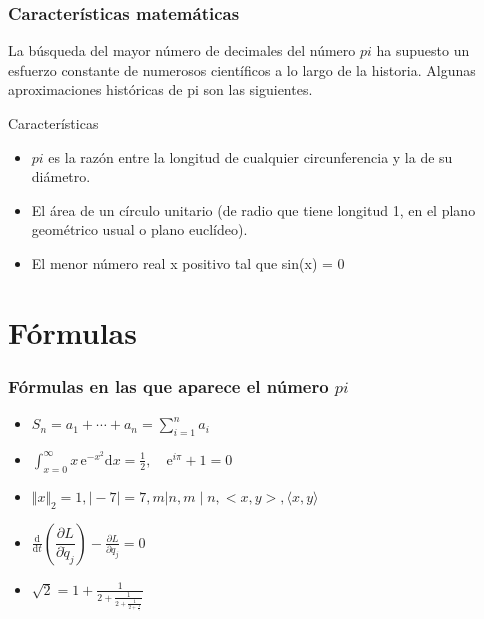 \documentclass{beamer}
\begin{document}
\begin{frame}

\frametitle{Características matemáticas}
La búsqueda del mayor número de decimales
del número $pi$ ha supuesto un esfuerzo constante
de numerosos científicos a lo largo de la historia.
Algunas aproximaciones históricas de pi son las
siguientes.
\begin{block}{Características}
  \begin{itemize}
  \item
  $pi$ es la razón entre la longitud de cualquier circunferencia y la de su diámetro.
  \pause

  \item
  El área de un círculo unitario (de radio que tiene longitud 1, en el plano geométrico usual o plano euclídeo).
  \pause

  \item
  El menor número real x positivo tal que sin(x) = 0

  \end{itemize}
\end{block}

\end{frame}

\section{Fórmulas}


\begin{frame}
\frametitle{Fórmulas en las que aparece el número $pi$}
\begin{itemize}
  \item
  $S_n=a_1+\cdots + a_n = \sum_{i=1}^n a_i $
  \pause

  \item
  $\int_{x=0}^{\infty} x\,\text{e}^{-x^2}
\text{d}x=\frac{1}{2},\quad\text{e}^{i\pi}+1=0$
  \pause
  
  \item
  $\Vert x \Vert_2=1, \vert -7 \vert = 7,
m|n, m\mid n, <x,y>, \langle x, y\rangle$
  \pause
 
  \item
  $\frac{\text{d}}{\text{d}t}\left(\dfrac{\partial L}
{\partial\dot q_j}\right)-\frac{\partial L}
{\partial q_j}=0$
  \pause
   
  \item
  $\sqrt 2 = 1+\frac{1}{2+\frac{1}{2+
\frac{1}{2+\frac{1}{\ddots}}}} $
  \pause

  \end{itemize}
\end{frame}
\end{document}
